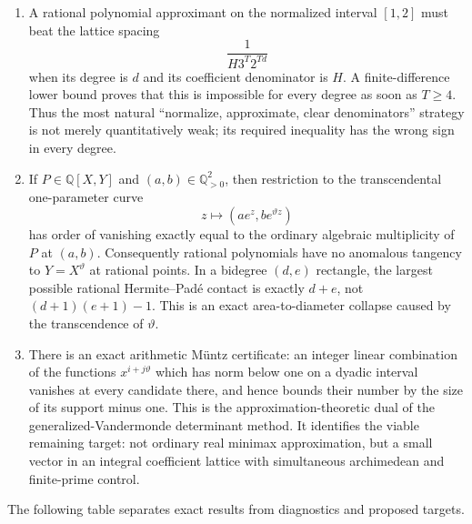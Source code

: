 \documentclass[11pt,oneside]{article}
\theoremstyle{definition}
\theoremstyle{remark}
\newcommand{\Q}{\mathbb Q}
\newcommand{\thetaq}{\vartheta}
\begin{document}
\begin{enumerate}
\item A rational polynomial approximant on the normalized interval \([1,2]\) must beat the
lattice spacing
\[
  \frac{1}{H3^T2^{Td}}
\]
when its degree is \(d\) and its coefficient denominator is \(H\).  A finite-difference lower
bound proves that this is impossible for every degree as soon as \(T\ge4\).  Thus the most
natural ``normalize, approximate, clear denominators'' strategy is not merely quantitatively
weak; its required inequality has the wrong sign in every degree.

\item If \(P\in\Q[X,Y]\) and \((a,b)\in\Q_{>0}^2\), then restriction to the transcendental
one-parameter curve
\[
  z\longmapsto(ae^z,be^{\thetaq z})
\]
has order of vanishing exactly equal to the ordinary algebraic multiplicity of \(P\) at
\((a,b)\).  Consequently rational polynomials have no anomalous tangency to
\(Y=X^{\thetaq}\) at rational points.  In a bidegree \((d,e)\) rectangle, the largest possible
rational Hermite--Pad\'e contact is exactly \(d+e\), not
\((d+1)(e+1)-1\).  This is an exact area-to-diameter collapse caused by the transcendence of
\(\thetaq\).

\item There is an exact arithmetic M\"untz certificate: an integer linear combination of the
functions \(x^{i+j\thetaq}\) which has norm below one on a dyadic interval vanishes at every
candidate there, and hence bounds their number by the size of its support minus one.  This is
the approximation-theoretic dual of the generalized-Vandermonde determinant method.  It
identifies the viable remaining target: not ordinary real minimax approximation, but a small
vector in an integral coefficient lattice with simultaneous archimedean and finite-prime
control.
\end{enumerate}

The following table separates exact results from diagnostics and proposed targets.
\end{document}
